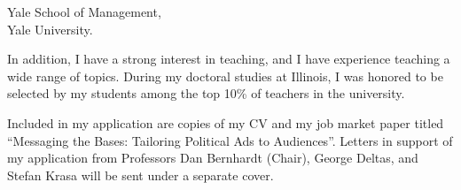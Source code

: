 \documentclass[12pt]{letter}
\begin{document}
\begin{letter}{Yale School of Management,\\
Yale University.}





In addition, I have a strong interest in teaching, and I have experience teaching a wide range of topics.
During my doctoral studies at Illinois, I was honored to be selected by my students among the top 10\% of teachers in the university.


Included in my application are copies of my CV and my job market paper titled ``Messaging the Bases: Tailoring Political Ads to Audiences''.
Letters in support of my application from Professors Dan Bernhardt (Chair), George Deltas, and Stefan Krasa will be sent under a separate cover. 


\end{letter}
\end{document}
